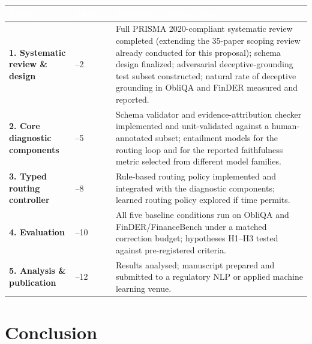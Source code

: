 \documentclass[11pt,a4paper]{article}
\begin{document}
{\setlength{\parskip}{0pt}
\renewcommand{\arraystretch}{1.25}
\setlength{\tabcolsep}{5pt}
\fontsize{9.5}{12}\selectfont
\begin{tabular}{|>{\bfseries}m{90pt}|>{\centering\arraybackslash}m{60pt}|p{280pt}|}
\hline
\rowcolor{ruleblue}
\textcolor{white}{\fontsize{10}{12}\selectfont\textbf{Phase}} &
\textcolor{white}{\fontsize{10}{12}\selectfont\textbf{Months}} &
\textcolor{white}{\fontsize{10}{12}\selectfont\textbf{Milestone / Deliverable}} \\ \hline
1. Systematic review \& design & 1--2 & Full PRISMA 2020-compliant systematic review
completed (extending the 35-paper scoping review already conducted for this proposal);
schema design finalized; adversarial deceptive-grounding test subset constructed; natural
rate of deceptive grounding in ObliQA and FinDER measured and reported. \\ \hline
2. Core diagnostic components & 3--5 & Schema validator and evidence-attribution checker
implemented and unit-validated against a human-annotated subset; entailment models for the
routing loop and for the reported faithfulness metric selected from different model
families. \\ \hline
3. Typed routing controller & 6--8 & Rule-based routing policy implemented and integrated
with the diagnostic components; learned routing policy explored if time permits. \\ \hline
4. Evaluation & 9--10 & All five baseline conditions run on ObliQA and
FinDER/FinanceBench under a matched correction budget; hypotheses H1--H3 tested against
pre-registered criteria. \\ \hline
5. Analysis \& publication & 11--12 & Results analysed; manuscript prepared and submitted
to a regulatory NLP or applied machine learning venue. \\ \hline
\end{tabular}\par}

\section{Conclusion}
\end{document}
